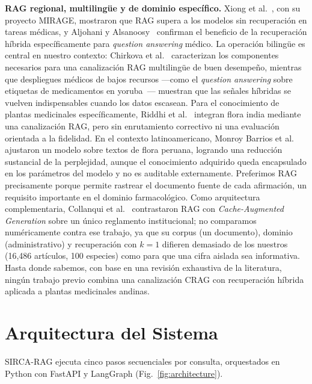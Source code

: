 \documentclass[runningheads]{llncs}
\newcommand{\sirca}{\textsc{SIRCA-RAG}}
\begin{document}
\textbf{RAG regional, multiling\"{u}e y de dominio espec\'{i}fico.} Xiong et al.~\cite{xiong2024mirage}, con su proyecto MIRAGE, mostraron que RAG supera a los modelos sin recuperaci\'{o}n en tareas m\'{e}dicas, y Aljohani y Alsanoosy~\cite{aljohani2026hybridmedical} confirman el beneficio de la recuperaci\'{o}n h\'{i}brida espec\'{i}ficamente para \emph{question answering} m\'{e}dico. La operaci\'{o}n biling\"{u}e es central en nuestro contexto: Chirkova et al.~\cite{chirkova2024multilingual} caracterizan los componentes necesarios para una canalizaci\'{o}n RAG multiling\"{u}e de buen desempe\~{n}o, mientras que despliegues m\'{e}dicos de bajos recursos ---como el \emph{question answering} sobre etiquetas de medicamentos en yoruba~\cite{adebesin2026yoruba}--- muestran que las se\~{n}ales h\'{i}bridas se vuelven indispensables cuando los datos escasean. Para el conocimiento de plantas medicinales espec\'{i}ficamente, Riddhi et al.~\cite{riddhi2025indianplants} integran flora india mediante una canalizaci\'{o}n RAG, pero sin enrutamiento correctivo ni una evaluaci\'{o}n orientada a la fidelidad. En el contexto latinoamericano, Monroy Barrios et al.~\cite{monroy2026finetuning} ajustaron un modelo sobre textos de flora peruana, logrando una reducci\'{o}n sustancial de la perplejidad, aunque el conocimiento adquirido queda encapsulado en los par\'{a}metros del modelo y no es auditable externamente. Preferimos RAG precisamente porque permite rastrear el documento fuente de cada afirmaci\'{o}n, un requisito importante en el dominio farmacol\'{o}gico. Como arquitectura complementaria, Collanqui et al.~\cite{collanqui2026cagrag} contrastaron RAG con \emph{Cache-Augmented Generation} sobre un \'{u}nico reglamento institucional; no comparamos num\'{e}ricamente contra ese trabajo, ya que su corpus (un documento), dominio (administrativo) y recuperaci\'{o}n con $k{=}1$ difieren demasiado de los nuestros (16{,}486 art\'{i}culos, 100 especies) como para que una cifra aislada sea informativa. Hasta donde sabemos, con base en una revisi\'{o}n exhaustiva de la literatura, ning\'{u}n trabajo previo combina una canalizaci\'{o}n CRAG con recuperaci\'{o}n h\'{i}brida aplicada a plantas medicinales andinas.

\section{Arquitectura del Sistema}
\label{sec:architecture}

\sirca{} ejecuta cinco pasos secuenciales por consulta, orquestados en Python con FastAPI y LangGraph (Fig.~\ref{fig:architecture}).
\end{document}
